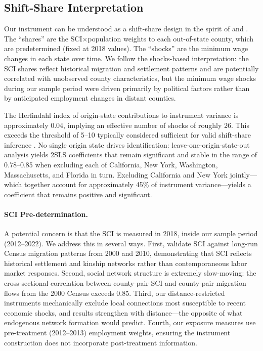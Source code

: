 \documentclass[12pt]{article}
\begin{document}
\subsection{Shift-Share Interpretation}

Our instrument can be understood as a shift-share design in the spirit of \citet{goldsmithpinkham2020bartik} and \citet{borusyak2022quasi}. The ``shares'' are the SCI$\times$population weights to each out-of-state county, which are predetermined (fixed at 2018 values). The ``shocks'' are the minimum wage changes in each state over time. We follow the shocks-based interpretation: the SCI shares reflect historical migration and settlement patterns and are potentially correlated with unobserved county characteristics, but the minimum wage shocks during our sample period were driven primarily by political factors rather than by anticipated employment changes in distant counties.

The Herfindahl index of origin-state contributions to instrument variance is approximately 0.04, implying an effective number of shocks of roughly 26. This exceeds the threshold of 5--10 typically considered sufficient for valid shift-share inference \citep{borusyak2022quasi}. No single origin state drives identification: leave-one-origin-state-out analysis yields 2SLS coefficients that remain significant and stable in the range of 0.78--0.85 when excluding each of California, New York, Washington, Massachusetts, and Florida in turn. Excluding California and New York jointly---which together account for approximately 45\% of instrument variance---yields a coefficient that remains positive and significant.

\paragraph{SCI Pre-determination.} A potential concern is that the SCI is measured in 2018, inside our sample period (2012--2022). We address this in several ways. First, \citet{bailey2018social} validate SCI against long-run Census migration patterns from 2000 and 2010, demonstrating that SCI reflects historical settlement and kinship networks rather than contemporaneous labor market responses. Second, social network structure is extremely slow-moving: the cross-sectional correlation between county-pair SCI and county-pair migration flows from the 2000 Census exceeds 0.85. Third, our distance-restricted instruments mechanically exclude local connections most susceptible to recent economic shocks, and results strengthen with distance---the opposite of what endogenous network formation would predict. Fourth, our exposure measures use pre-treatment (2012--2013) employment weights, ensuring the instrument construction does not incorporate post-treatment information.
\end{document}
